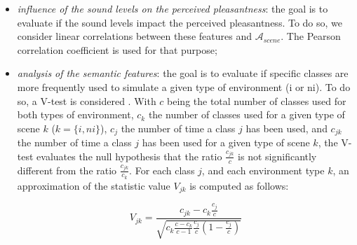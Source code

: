 \documentclass[12pt]{elsarticle}
\begin{document}
\begin{itemize}
\item \emph{influence of the sound levels on the perceived pleasantness}: the goal is to evaluate if the sound levels impact the perceived pleasantness. To do so, we consider linear correlations between these features and $\mathcal{A}_{scene}$. The Pearson correlation coefficient is used for that purpose;



\item \emph{analysis of the semantic features}: the goal is to evaluate if specific classes are more frequently used to simulate a given type of environment (i or ni). To do so, a V-test is considered \citep{rakotomalala2008tvpercent}. With $c$ being the total number of classes used for both types of environment, $c_k$ the number of classes used for a given type of scene $k$ ($k=\lbrace i,ni\rbrace$), $c_j$ the number of time a class $j$ has been used, and $c_{jk}$ the number of time a class $j$ has been used for a given type of scene $k$, the V-test evaluates the null hypothesis that the ratio $\frac{c_{jk}}{c}$ is not significantly different from the ratio $\frac{c_{jk}}{c_k}$. For each class $j$, and each environment type $k$, an approximation of the statistic value $V_{jk}$ is computed as follows:

\begin{equation}
V_{jk}=\dfrac{c_{jk}-c_k\frac{c_j}{c}}{\sqrt{c_k\frac{c-c_k}{c-1}\frac{c_j}{c}(1-\frac{c_j}{c})}}
\end{equation}


\end{itemize}
\end{document}
